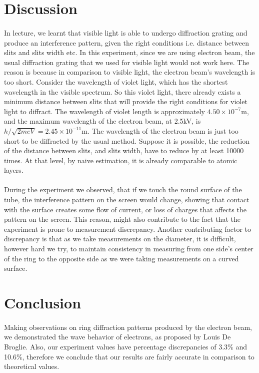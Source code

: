 \documentclass[11pt]{article}
\begin{document}
\section{Discussion}
\paragraph{}
In lecture, we learnt that visible light is able to undergo diffraction grating and produce an interference pattern, given the right conditions i.e. distance between slits and slits width etc. In this experiment, since we are using electron beam, the usual diffraction grating that we used for visible light would not work here. The reason is because in comparison to visible light, the electron beam's wavelength is too short. Consider the wavelength of violet light, which has the shortest wavelength in the visible spectrum. So this violet light, there already exists a minimum distance between slits that will provide the right conditions for violet light to diffract. The wavelength of violet length is approximately $4.50 \times 10^{-7}$m, and the maximum wavelength of the electron beam, at 2.5kV, is $h/\sqrt{2meV} = 2.45 \times 10^{-11}$m. The wavelength of the electron beam is just too short to be diffracted by the usual method. Suppose it is possible, the reduction of the distance between slits, and slits width, have to reduce by at least 10000 times. At that level, by naive estimation, it is already comparable to atomic layers.

\paragraph{}
During the experiment we observed, that if we touch the round surface of the tube, the interference pattern on the screen would change, showing that contact with the surface creates some flow of current, or loss of charges that affects the pattern on the screen. This reason, might also contribute to the fact that the experiment is prone to measurement discrepancy. Another contributing factor to discrepancy is that as we take measurements on the diameter, it is difficult, however hard we try, to maintain consistency in measuring from one side's center of the ring to the opposite side as we were taking measurements on a curved surface.

\section{Conclusion}
\paragraph{}
Making observations on ring diffraction patterns produced by the electron beam, we demonstrated the wave behavior of electrons, as proposed by Louis De Broglie. Also, our experiment values have percentage discrepancies of 3.3\% and 10.6\%, therefore we conclude that our results are fairly accurate in comparison to theoretical values.
\end{document}
